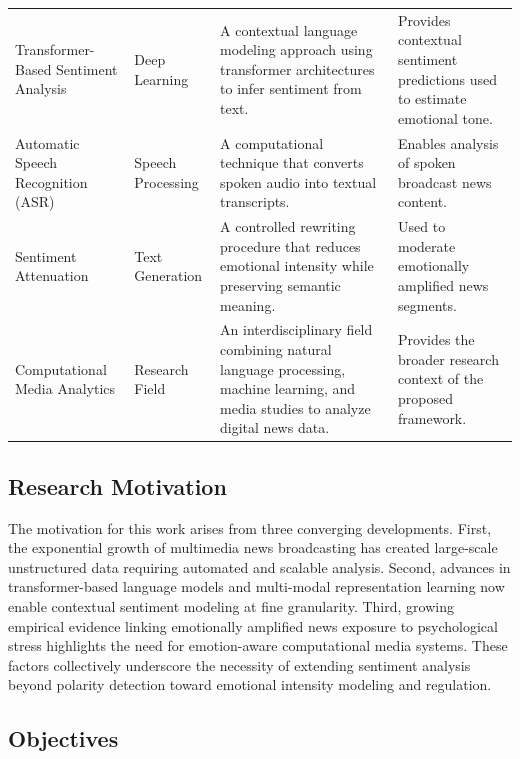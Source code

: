 \documentclass[final,1p,times]{elsarticle}
\begin{document}
\begin{table}[H]
\begin{tabular}{p{2.3cm} p{1.6cm} p{3.6cm} p{3.0cm}}
Transformer-Based Sentiment Analysis & Deep Learning &
A contextual language modeling approach using transformer architectures to infer sentiment from text. &
Provides contextual sentiment predictions used to estimate emotional tone. \\

Automatic Speech Recognition (ASR) & Speech Processing &
A computational technique that converts spoken audio into textual transcripts. &
Enables analysis of spoken broadcast news content. \\

Sentiment Attenuation & Text Generation &
A controlled rewriting procedure that reduces emotional intensity while preserving semantic meaning. &
Used to moderate emotionally amplified news segments. \\

Computational Media Analytics & Research Field &
An interdisciplinary field combining natural language processing, machine learning, and media studies to analyze digital news data. &
Provides the broader research context of the proposed framework. \\
\hline
\end{tabular}
\end{table}

\subsection{Research Motivation}

The motivation for this work arises from three converging developments. First, the exponential growth of multimedia news broadcasting has created large-scale unstructured data requiring automated and scalable analysis. Second, advances in transformer-based language models and multi-modal representation learning now enable contextual sentiment modeling at fine granularity. Third, growing empirical evidence linking emotionally amplified news exposure to psychological stress highlights the need for emotion-aware computational media systems. These factors collectively underscore the necessity of extending sentiment analysis beyond polarity detection toward emotional intensity modeling and regulation.

\subsection{Objectives}
\end{document}
